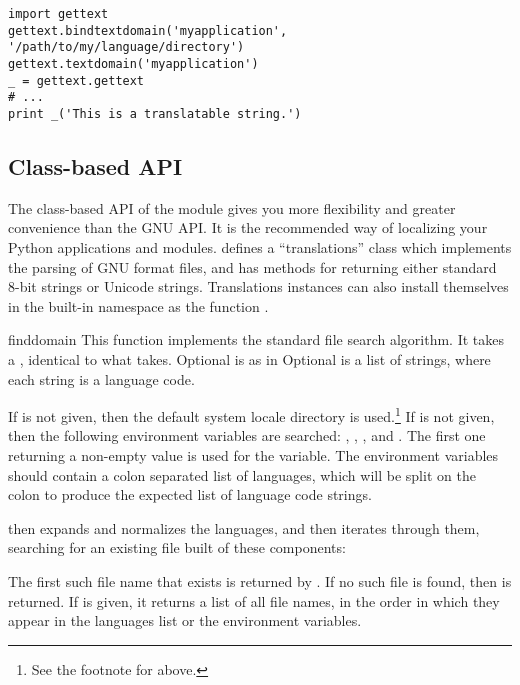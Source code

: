 \begin{verbatim}
import gettext
gettext.bindtextdomain('myapplication', '/path/to/my/language/directory')
gettext.textdomain('myapplication')
_ = gettext.gettext
# ...
print _('This is a translatable string.')
\end{verbatim}

\subsection{Class-based API}

The class-based API of the  module gives you more
flexibility and greater convenience than the GNU 
API.  It is the recommended way of localizing your Python applications and
modules.   defines a ``translations'' class which
implements the parsing of GNU  format files, and has methods
for returning either standard 8-bit strings or Unicode strings.
Translations instances can also install themselves in the built-in
namespace as the function \function{_()}.

\begin{funcdesc}{find}{domain}
This function implements the standard  file search
algorithm.  It takes a , identical to what
 takes.  Optional  is as in
  Optional  is a list of
strings, where each string is a language code.

If  is not given, then the default system locale
directory is used.\footnote{See the footnote for
 above.}  If  is not given,
then the following environment variables are searched: ,
, , and .  The first one
returning a non-empty value is used for the  variable.
The environment variables should contain a colon separated list of
languages, which will be split on the colon to produce the expected
list of language code strings.

 then expands and normalizes the languages, and then
iterates through them, searching for an existing file built of these
components:


The first such file name that exists is returned by .
If no such file is found, then  is returned. If 
is given, it returns a list of all file names, in the order in which
they appear in the languages list or the environment variables.
\end{funcdesc}

